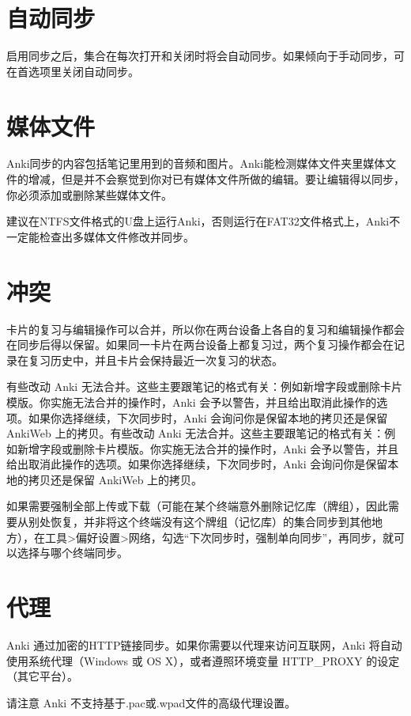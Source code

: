 \documentclass[a4paper]{book}
\begin{document}
	\section{自动同步}
	启用同步之后，集合在每次打开和关闭时将会自动同步。如果倾向于手动同步，可在首选项里关闭自动同步。
	\section{媒体文件}
	Anki同步的内容包括笔记里用到的音频和图片。Anki能检测媒体文件夹里媒体文件的增减，但是并不会察觉到你对已有媒体文件所做的编辑。要让编辑得以同步，你必须添加或删除某些媒体文件。
	
	
	\begin{shaded}
		建议在NTFS文件格式的U盘上运行Anki，否则运行在FAT32文件格式上，Anki不一定能检查出多媒体文件修改并同步。
	\end{shaded}
	
	\section{冲突}
	卡片的复习与编辑操作可以合并，所以你在两台设备上各自的复习和编辑操作都会在同步后得以保留。如果同一卡片在两台设备上都复习过，两个复习操作都会在记录在复习历史中，并且卡片会保持最近一次复习的状态。
	
	有些改动 Anki 无法合并。这些主要跟笔记的格式有关：例如新增字段或删除卡片模版。你实施无法合并的操作时，Anki 会予以警告，并且给出取消此操作的选项。如果你选择继续，下次同步时，Anki 会询问你是保留本地的拷贝还是保留 AnkiWeb 上的拷贝。有些改动 Anki 无法合并。这些主要跟笔记的格式有关：例如新增字段或删除卡片模版。你实施无法合并的操作时，Anki 会予以警告，并且给出取消此操作的选项。如果你选择继续，下次同步时，Anki 会询问你是保留本地的拷贝还是保留 AnkiWeb 上的拷贝。
	
	如果需要强制全部上传或下载（可能在某个终端意外删除记忆库（牌组），因此需要从别处恢复，并非将这个终端没有这个牌组（记忆库）的集合同步到其他地方），在工具>偏好设置>网络，勾选“下次同步时，强制单向同步”，再同步，就可以选择与哪个终端同步。
	
	\section{代理}
	
	Anki 通过加密的HTTP链接同步。如果你需要以代理来访问互联网，Anki 将自动使用系统代理（Windows 或 OS X），或者遵照环境变量 HTTP\_PROXY 的设定（其它平台）。
	
	请注意 Anki 不支持基于.pac或.wpad文件的高级代理设置。
	
\end{document}
